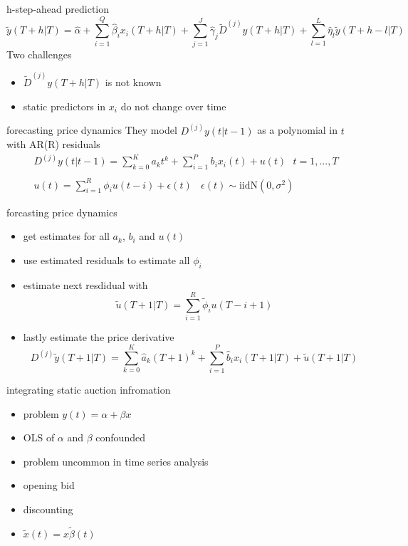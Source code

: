 \documentclass[hyperref={pdfpagelabels=false}]{beamer}
\begin{document}
\begin{frame}{h-step-ahead prediction}
\small
\begin{equation}
\tilde{y}(T+h|T)=\hat{\alpha}+\sum_{i=1}^{Q}\hat{\beta}_ix_i(T+h|T)+\sum_{j=1}^J\hat{\gamma}_j\tilde{D}^{(j)}y(T+h|T)+\sum_{l=1}^L\hat{\eta}_l\tilde{y}(T+h-l|T) \nonumber
\end{equation}
\normalsize
\newline
Two challenges
\begin{itemize}
    \item $\tilde{D}^{(j)}y(T+h|T)$ is not known
    \item static predictors in $x_i$ do not change over time
\end{itemize}
\end{frame}

\begin{frame}{forecasting price dynamics}
They model $D^{(j)}y(t|t-1)$ as a polynomial in $t$ with AR(R) residuals
\begin{align}
D^{(j)}y(t|t-1) =\sum_{k=0}^Ka_kt^k+\sum_{i=1}^Pb_ix_i(t)+u(t) \ \ \ t=1,...,T \nonumber \\ \nonumber \\ u(t)=\sum_{i=1}^R\phi_i u(t-i)+\epsilon(t) \ \ \ \ \epsilon(t) \sim \text{iidN}(0,\sigma^2) \nonumber
\end{align} 
\end{frame}

\begin{frame}{forcasting price dynamics}
\begin{itemize}
    \item get estimates for all $a_k$, $b_i$ and $u(t)$
    \item use estimated residuals to estimate all $\phi_i$
    \item estimate next resdidual with \begin{equation}  \tilde{u}(T+1|T)=\sum_{i=1}^R\tilde{\phi}_iu(T-i+1) \nonumber \end{equation}
    \item lastly estimate the price derivative \begin{equation} D^{(j)}\tilde{y}(T+1|T) =\sum_{k=0}^K\hat{a}_k(T+1)^k+\sum_{i=1}^P\hat{b}_ix_i(T+1|T)+\tilde{u}(T+1|T) \nonumber \end{equation}
\end{itemize}    
\end{frame}

\begin{frame}{integrating static auction infromation}%
\begin{itemize}
    \item problem $y(t)=\alpha +\beta x$
    \item OLS of $\alpha$ and $\beta$ confounded
    \item problem uncommon in time series analysis
    \item opening bid
    \item discounting
    \item $\tilde{x}(t)=x\tilde{\beta}(t)$
\end{itemize}
\end{frame}
\end{document}
